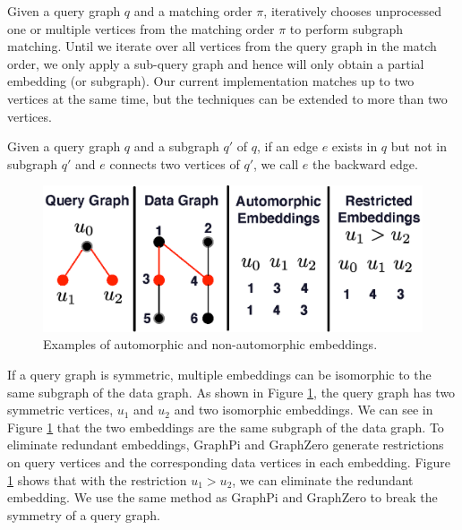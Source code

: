  Given a query graph $q$ and a matching order $\pi$, \SystemName iteratively chooses unprocessed one or
multiple vertices from the matching order $\pi$ to perform subgraph matching. Until we iterate over all vertices from the query graph in
the match order, we only apply a sub-query graph and hence will only obtain a partial embedding (or subgraph). Our current implementation
matches up to two vertices at the same time, but the techniques can be extended to more than two vertices.


 Given a query graph $q$ and a subgraph $q'$ of $q$, if an edge $e$ exists in $q$ but not in subgraph $q'$ and
$e$ connects two vertices of $q'$, we call $e$ the backward edge.

\begin{figure}
\centering
\includegraphics[width=\columnwidth]{./figure/automorphism.eps}
\caption{Examples of automorphic and non-automorphic embeddings.}	
\label{fig:automo}
\end{figure}

If a query graph is symmetric, multiple embeddings can be isomorphic to the same subgraph of the data graph. As shown in Figure
\ref{fig:automo}, the query graph has two symmetric vertices, $u_1$ and $u_2$ and two isomorphic embeddings. We can see in Figure
\ref{fig:automo} that the two embeddings are the same subgraph of the data graph. To eliminate redundant embeddings, GraphPi
\cite{shi2020graphpi} and GraphZero \cite{mawhirter2019graphzero} generate restrictions on query vertices and the corresponding data
vertices in each embedding. Figure \ref{fig:automo} shows that with the restriction $u_1 > u_2$, we can eliminate the redundant embedding.
We use the same method as GraphPi and GraphZero to break the symmetry of a query graph.

